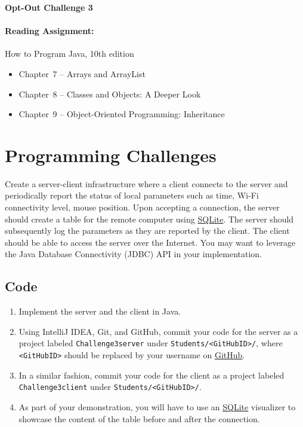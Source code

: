 \documentclass[11pt]{article}
\begin{document}
\begin{center}
{\bfseries \LARGE Opt-Out Challenge 3}
\end{center}

\paragraph{Reading Assignment:}
How to Program Java, 10th edition
\begin{itemize}
\item Chapter~7 -- Arrays and ArrayList
\item Chapter~8 -- Classes and Objects: A Deeper Look
\item Chapter~9 -- Object-Oriented Programming: Inheritance
\end{itemize}


\section*{Programming Challenges}

Create a server-client infrastructure where a client connects to the server and periodically report the status of local parameters such as time, Wi-Fi connectivity level, mouse position.
Upon accepting a connection, the server should create a table for the remote computer using \href{http://www.sqlite.org/}{SQLite}.
The server should subsequently log the parameters as they are reported by the client.
The client should be able to access the server over the Internet.
You may want to leverage the Java Database Connectivity (JDBC) API in your implementation.


\subsection*{Code}

\begin{enumerate}
\item Implement the server and the client in Java.
\item Using IntelliJ IDEA, Git, and GitHub, commit your code for the server as a project labeled \texttt{Challenge3server} under \texttt{Students/<GitHubID>/}, where \texttt{<GitHubID>} should be replaced by your username on \href{https://GitHub.com}{GitHub}.
\item In a similar fashion, commit your code for the client as a project labeled \texttt{Challenge3client} under \texttt{Students/<GitHubID>/}.
\item As part of your demonstration, you will have to use an \href{http://www.sqlite.org/}{SQLite} visualizer to showcase the content of the table before and after the connection.
\end{enumerate}
\end{document}
